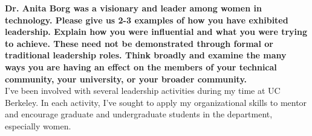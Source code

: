 \documentclass{article}
\begin{document}
	
\pagestyle{plain}

\textbf{Dr. Anita Borg was a visionary and leader among women in technology. Please give us 2-3 examples of how you have exhibited leadership. Explain how you were influential and what you were trying to achieve. These need not be demonstrated through formal or traditional leadership roles. Think broadly and examine the many ways you are having an effect on the members of your technical community, your university, or your broader community.}\\

I've been involved with several leadership activities during my time at UC Berkeley.
In each activity, I've sought to apply my organizational skills to mentor and encourage graduate and undergraduate students in the department, especially women.
\end{document}
